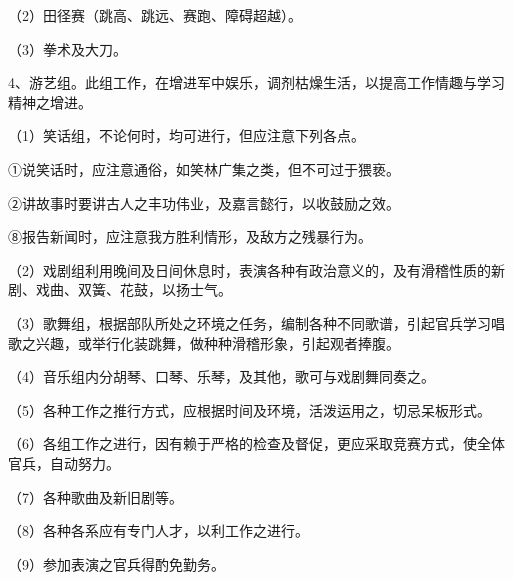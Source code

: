（2）田径赛（跳高、跳远、赛跑、障碍超越）。

（3）拳术及大刀。

4、游艺组。此组工作，在增进军中娱乐，调剂枯燥生活，以提高工作情趣与学习精神之增进。

（1）笑话组，不论何时，均可进行，但应注意下列各点。

①说笑话时，应注意通俗，如笑林广集之类，但不可过于猥亵。

②讲故事时要讲古人之丰功伟业，及嘉言懿行，以收鼓励之效。

⑧报告新闻时，应注意我方胜利情形，及敌方之残暴行为。

（2）戏剧组利用晚间及日间休息时，表演各种有政治意义的，及有滑稽性质的新剧、戏曲、双簧、花鼓，以扬士气。

（3）歌舞组，根据部队所处之环境之任务，编制各种不同歌谱，引起官兵学习唱歌之兴趣，或举行化装跳舞，做种种滑稽形象，引起观者捧腹。

（4）音乐组内分胡琴、口琴、乐琴，及其他，歌可与戏剧舞同奏之。

（5）各种工作之推行方式，应根据时间及环境，活泼运用之，切忌呆板形式。

（6）各组工作之进行，因有赖于严格的检查及督促，更应采取竞赛方式，使全体官兵，自动努力。

（7）各种歌曲及新旧剧等。

（8）各种各系应有专门人才，以利工作之进行。

（9）参加表演之官兵得酌免勤务。

